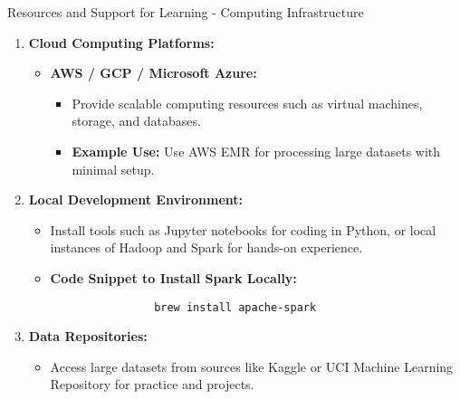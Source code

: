 \documentclass[aspectratio=169]{beamer}
\begin{document}
\begin{frame}[fragile]{Resources and Support for Learning - Computing Infrastructure}
    \begin{enumerate}
        \item \textbf{Cloud Computing Platforms:}
            \begin{itemize}
                \item \textbf{AWS / GCP / Microsoft Azure:}
                \begin{itemize}
                    \item Provide scalable computing resources such as virtual machines, storage, and databases.
                    \item \textbf{Example Use:} Use AWS EMR for processing large datasets with minimal setup.
                \end{itemize}
            \end{itemize}

        \item \textbf{Local Development Environment:}
            \begin{itemize}
                \item Install tools such as Jupyter notebooks for coding in Python, or local instances of Hadoop and Spark for hands-on experience.
                \item \textbf{Code Snippet to Install Spark Locally:}
                \begin{lstlisting}
                brew install apache-spark
                \end{lstlisting}
            \end{itemize}

        \item \textbf{Data Repositories:}
            \begin{itemize}
                \item Access large datasets from sources like Kaggle or UCI Machine Learning Repository for practice and projects.
            \end{itemize}
    \end{enumerate}
\end{frame}
\end{document}
